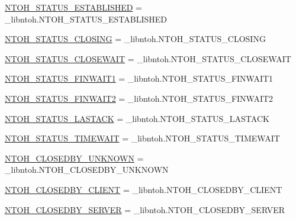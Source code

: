 \begin{DoxyCompactItemize}
\hyperlink{namespacelibntoh_a7dc1081e3189bc10886fa08603178984}{N\-T\-O\-H\-\_\-\-S\-T\-A\-T\-U\-S\-\_\-\-E\-S\-T\-A\-B\-L\-I\-S\-H\-E\-D} = \-\_\-libntoh.\-N\-T\-O\-H\-\_\-\-S\-T\-A\-T\-U\-S\-\_\-\-E\-S\-T\-A\-B\-L\-I\-S\-H\-E\-D
\item 
\hyperlink{namespacelibntoh_a5924c0c76e8d72be4f4c7c53929f5dc1}{N\-T\-O\-H\-\_\-\-S\-T\-A\-T\-U\-S\-\_\-\-C\-L\-O\-S\-I\-N\-G} = \-\_\-libntoh.\-N\-T\-O\-H\-\_\-\-S\-T\-A\-T\-U\-S\-\_\-\-C\-L\-O\-S\-I\-N\-G
\item 
\hyperlink{namespacelibntoh_a575f2a3f1fdda833387200b321f1b6ec}{N\-T\-O\-H\-\_\-\-S\-T\-A\-T\-U\-S\-\_\-\-C\-L\-O\-S\-E\-W\-A\-I\-T} = \-\_\-libntoh.\-N\-T\-O\-H\-\_\-\-S\-T\-A\-T\-U\-S\-\_\-\-C\-L\-O\-S\-E\-W\-A\-I\-T
\item 
\hyperlink{namespacelibntoh_a7da6ee7546a1ae8cbe7935c892b7cc40}{N\-T\-O\-H\-\_\-\-S\-T\-A\-T\-U\-S\-\_\-\-F\-I\-N\-W\-A\-I\-T1} = \-\_\-libntoh.\-N\-T\-O\-H\-\_\-\-S\-T\-A\-T\-U\-S\-\_\-\-F\-I\-N\-W\-A\-I\-T1
\item 
\hyperlink{namespacelibntoh_ae08638e158a248b6f781e24a5bca7a9b}{N\-T\-O\-H\-\_\-\-S\-T\-A\-T\-U\-S\-\_\-\-F\-I\-N\-W\-A\-I\-T2} = \-\_\-libntoh.\-N\-T\-O\-H\-\_\-\-S\-T\-A\-T\-U\-S\-\_\-\-F\-I\-N\-W\-A\-I\-T2
\item 
\hyperlink{namespacelibntoh_a9edfe2e24b95c812a93fcdd60ed29d09}{N\-T\-O\-H\-\_\-\-S\-T\-A\-T\-U\-S\-\_\-\-L\-A\-S\-T\-A\-C\-K} = \-\_\-libntoh.\-N\-T\-O\-H\-\_\-\-S\-T\-A\-T\-U\-S\-\_\-\-L\-A\-S\-T\-A\-C\-K
\item 
\hyperlink{namespacelibntoh_a5afc3963cb1af988baff9f9e40ae1e59}{N\-T\-O\-H\-\_\-\-S\-T\-A\-T\-U\-S\-\_\-\-T\-I\-M\-E\-W\-A\-I\-T} = \-\_\-libntoh.\-N\-T\-O\-H\-\_\-\-S\-T\-A\-T\-U\-S\-\_\-\-T\-I\-M\-E\-W\-A\-I\-T
\item 
\hyperlink{namespacelibntoh_af53d3c77d30d1a9c3126c6fa1d331c11}{N\-T\-O\-H\-\_\-\-C\-L\-O\-S\-E\-D\-B\-Y\-\_\-\-U\-N\-K\-N\-O\-W\-N} = \-\_\-libntoh.\-N\-T\-O\-H\-\_\-\-C\-L\-O\-S\-E\-D\-B\-Y\-\_\-\-U\-N\-K\-N\-O\-W\-N
\item 
\hyperlink{namespacelibntoh_a487d8935d3c4a40ffb1705d7d88bc196}{N\-T\-O\-H\-\_\-\-C\-L\-O\-S\-E\-D\-B\-Y\-\_\-\-C\-L\-I\-E\-N\-T} = \-\_\-libntoh.\-N\-T\-O\-H\-\_\-\-C\-L\-O\-S\-E\-D\-B\-Y\-\_\-\-C\-L\-I\-E\-N\-T
\item 
\hyperlink{namespacelibntoh_a33be5e33274b7378f4667b2a28a09687}{N\-T\-O\-H\-\_\-\-C\-L\-O\-S\-E\-D\-B\-Y\-\_\-\-S\-E\-R\-V\-E\-R} = \-\_\-libntoh.\-N\-T\-O\-H\-\_\-\-C\-L\-O\-S\-E\-D\-B\-Y\-\_\-\-S\-E\-R\-V\-E\-R
\item 

\end{DoxyCompactItemize}

